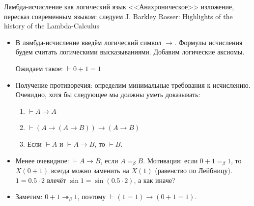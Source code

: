 \documentclass[aspectratio=169]{beamer}
\begin{document}
\begin{frame}{Лямбда-исчисление как логический язык}
<<Анахроническое>> изложение, пересказ современным языком: следуем
J. Barkley Rosser: Highlights of the history of the Lambda-Calculus

\begin{itemize}
\item В лямбда-исчисление введём логический символ $\rightarrow$. Формулы исчисления будем считать
логическими высказываниями.
Добавим логические аксиомы.

Ожидаем такое: $\vdash 0+1 = 1$

\item Получение противоречия: определим минимальные требования к исчислению. 
Очевидно, хотя бы следующее мы должны уметь доказывать:

\begin{enumerate}
	\item $\vdash A \rightarrow A$
	\item $\vdash (A \rightarrow (A \rightarrow B)) \rightarrow (A \rightarrow B)$
	\item Если $\vdash A$ и $\vdash A \rightarrow B$, то $\vdash B$.
\end{enumerate}

\item Менее очевидное: $\vdash A \rightarrow B$, если $A =_{\beta} B$. Мотивация: если $0+1 =_\beta 1$, то
$X(0+1)$ всегда можно заменить на $X(1)$ (равенство по Лейбницу). \pause
$1 = 0.5\cdot 2$ влечёт $\sin 1 = \sin (0.5\cdot 2)$, а как иначе?\pause

\item Заметим: $0+1 \twoheadrightarrow_\beta 1$, поэтому $\vdash (1 =1) \rightarrow (0+1 = 1)$.
\end{itemize}
\end{frame}
\end{document}
